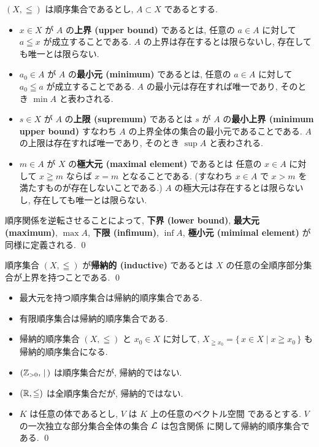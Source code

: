 \documentclass[12pt,twoside]{jarticle}
\begin{document}
\begin{definition}
  $(X,\leqq)$ は順序集合であるとし, $A\subset X$ であるとする.
  \begin{itemize}
  \item  $x\in X$ が $A$ の{\bf 上界 (upper bound)} であるとは, 
    任意の $a\in A$ に対して $a\leqq x$ が成立することである.
    $A$ の上界は存在するとは限らないし, 存在しても唯一とは限らない.
  \item $a_0\in A$ が $A$ の{\bf 最小元 (minimum)} であるとは,
    任意の $a\in A$ に対して $a_0\leqq a$ が成立することである.
    $A$ の最小元は存在すれば唯一であり, そのとき $\min A$ と表わされる.
  \item $s\in X$ が $A$ の{\bf 上限 (supremum)} であるとは
    $s$ が $A$ の{\bf 最小上界 (minimum upper bound)} 
    すなわち $A$ の上界全体の集合の最小元であることである.
    $A$ の上限は存在すれば唯一であり, そのとき $\sup A$ と表わされる.
  \item $m\in A$ が $X$ の{\bf 極大元 (maximal element)} であるとは
    任意の $x\in A$ に対して $x\geqq m$ ならば $x=m$ となることである.
    (すなわち $x\in A$ で $x>m$ を満たすものが存在しないことである.)
    $A$ の極大元は存在するとは限らないし, 存在しても唯一とは限らない.
  \end{itemize}
  順序関係を逆転させることによって, 
  {\bf 下界 (lower bound)}, {\bf 最大元 (maximum)}, $\max A$, 
  {\bf 下限 (infimum)}, $\inf A$, {\bf 極小元 (mimimal element)} 
  が同様に定義される.
  \qed
\end{definition}

\begin{definition}[帰納的順序集合]
  順序集合 $(X,\leqq)$ が{\bf 帰納的 (inductive)} であるとは %
  $X$ の任意の全順序部分集合が上界を持つことである.
  \qed
\end{definition}

\begin{example}[帰納的順序集合およびそうでない順序集合の例]
  \quad
  \begin{itemize}
  \item 最大元を持つ順序集合は帰納的順序集合である.
  \item 有限順序集合は帰納的順序集合である.
  \item 帰納的順序集合 $(X,\leqq)$ と $x_0\in X$ に対して, %
    $X_{\geqq x_0} = \{\,x\in X \mid x \geqq x_0 \,\}$ も帰納的順序集合になる.
  \item $({\mathbb Z}_{>0},\,\mid\,)$ は順序集合だが, 帰納的ではない.
  \item $({\mathbb R}, \leqq)$ は全順序集合だが, 帰納的ではない.
  \item $K$ は任意の体であるとし, $V$ は $K$ 上の任意のベクトル空間
    であるとする. $V$ の一次独立な部分集合全体の集合 ${\mathcal L}$ は包含関係
    に関して帰納的順序集合である.
    \qed
  \end{itemize}
\end{example}
\end{document}
